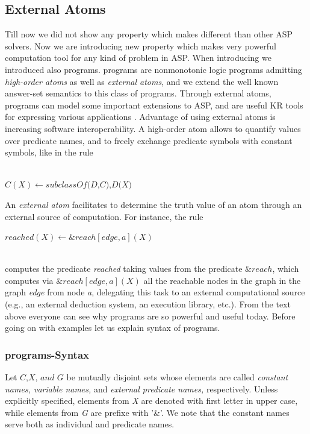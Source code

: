 \documentclass[14pt,a4paper, titlepage]{article}
\begin{document}
\subsection{External Atoms}
Till now we did not show any property which makes \dlvhex{} different than other ASP solvers. Now we are introducing new property which makes \dlvhex{} very powerful computation tool for any kind of problem in ASP. When introducing \dlvhex{} we introduced also \hex{} programs. \hex{} programs are nonmonotonic logic programs admitting \textit{high-order atoms} as well as \textit{external atoms}, and we extend the well known answer-set semantics to this class of programs. Through external atoms, \hex{} programs can model some important extensions to ASP, and are useful KR tools for expressing various applications \cite{extatoms2}. Advantage of using external atoms is increasing software interoperability. A high-order atom allows to quantify values over predicate names, and to freely exchange predicate symbols with constant symbols, like in the rule \centerline{\\$C(X) \leftarrow \textit{subclassOf(D,C),D(X)}$}
An \textit{external atom} facilitates to determine the truth value of an atom through an external source of computation. For instance, the rule \\ \centerline{ \textit{$reached(X) \leftarrow \&reach[edge,a](X)$}}
\\computes the predicate \textit{reached} taking values from the predicate $\&reach$, which computes via \textit{$\&reach[edge,a](X)$} all the reachable nodes in the graph in the graph \textit{edge} from node \textit{a}, delegating this task to an external computational source (e.g., an external deduction system, an execution library, etc.). From the text above everyone can see why \hex{} programs are so powerful and useful today.  Before going on with examples let us explain syntax of \hex{} programs. 
\subsubsection{\hex{} programs-Syntax}
Let $\textit{C,X, and G}$ be mutually disjoint sets whose elements are called \textit{constant names, variable names,} and \textit{external predicate names,} respectively. Unless explicitly specified, elements from \textit{X} are denoted with first letter in upper case, while elements from \textit{G} are prefixe with '\&'. We note that the constant names serve both as individual and predicate names.
\end{document}
